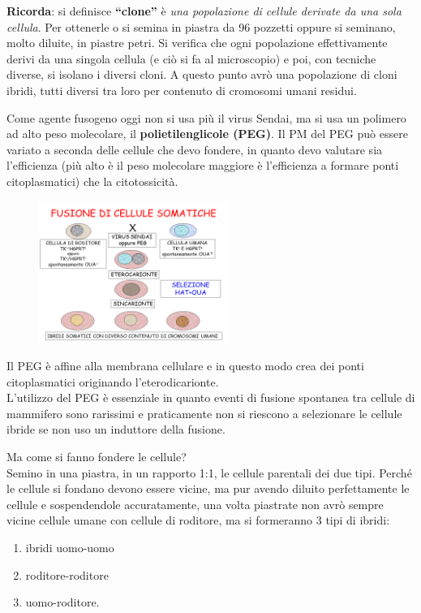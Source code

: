 \documentclass[11pt]{book}
\begin{document}
\textbf{Ricorda}: si definisce \textbf{``clone''} è \emph{una popolazione di cellule derivate da una sola cellula}. Per ottenerle o si semina in piastra da 96 pozzetti oppure si seminano, molto diluite, in piastre petri. Si verifica che ogni popolazione effettivamente derivi da una singola cellula (e ciò si fa al microscopio) e poi, con tecniche diverse, si isolano i diversi cloni. A questo punto avrò una popolazione di cloni ibridi, tutti diversi tra loro per contenuto di cromosomi umani residui.

Come agente fusogeno oggi non si usa più il virus Sendai, ma si usa un polimero ad alto peso molecolare, il \textbf{polietilenglicole (PEG)}. Il PM del PEG può essere variato a seconda delle cellule che devo fondere, in quanto devo valutare sia l’efficienza (più alto è il peso molecolare maggiore è l’efficienza a formare ponti citoplasmatici) che la citotossicità.

\begin{figure}
\centering
\includegraphics[width=0.55\textwidth]{img/32_fusione_cellule_somatiche.png}
  \caption{}
\end{figure}

Il PEG è affine alla membrana cellulare e in questo modo crea dei ponti citoplasmatici originando l’eterodicarionte.\\
L'utilizzo del PEG è essenziale in quanto eventi di fusione spontanea tra cellule di mammifero sono rarissimi e praticamente non si riescono a selezionare le cellule ibride se non uso un induttore della fusione. 

Ma come si fanno fondere le cellule?\\
Semino in una piastra, in un rapporto 1:1, le cellule parentali dei due tipi. Perché le cellule si fondano devono essere vicine, ma pur avendo diluito perfettamente le cellule e sospendendole accuratamente, una volta piastrate non avrò sempre vicine cellule umane con cellule di roditore, ma si formeranno 3 tipi di ibridi: 
\begin{enumerate}
\item ibridi uomo-uomo
\item roditore-roditore
\item uomo-roditore.
\end{enumerate}
\end{document}
